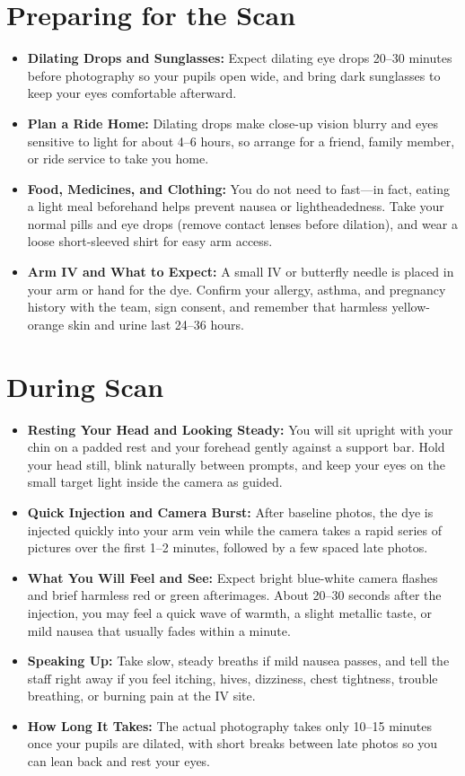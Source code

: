 \section{Preparing for the Scan}

\begin{itemize}
    \item \textbf{Dilating Drops and Sunglasses:} Expect dilating eye drops 20--30 minutes before photography so your pupils open wide, and bring dark sunglasses to keep your eyes comfortable afterward.
    \item \textbf{Plan a Ride Home:} Dilating drops make close-up vision blurry and eyes sensitive to light for about 4--6 hours, so arrange for a friend, family member, or ride service to take you home.
    \item \textbf{Food, Medicines, and Clothing:} You do not need to fast---in fact, eating a light meal beforehand helps prevent nausea or lightheadedness. Take your normal pills and eye drops (remove contact lenses before dilation), and wear a loose short-sleeved shirt for easy arm access.
    \item \textbf{Arm IV and What to Expect:} A small IV or butterfly needle is placed in your arm or hand for the dye. Confirm your allergy, asthma, and pregnancy history with the team, sign consent, and remember that harmless yellow-orange skin and urine last 24--36 hours.
\end{itemize}

\section{During Scan}

\begin{itemize}
    \item \textbf{Resting Your Head and Looking Steady:} You will sit upright with your chin on a padded rest and your forehead gently against a support bar. Hold your head still, blink naturally between prompts, and keep your eyes on the small target light inside the camera as guided.
    \item \textbf{Quick Injection and Camera Burst:} After baseline photos, the dye is injected quickly into your arm vein while the camera takes a rapid series of pictures over the first 1--2 minutes, followed by a few spaced late photos.
    \item \textbf{What You Will Feel and See:} Expect bright blue-white camera flashes and brief harmless red or green afterimages. About 20--30 seconds after the injection, you may feel a quick wave of warmth, a slight metallic taste, or mild nausea that usually fades within a minute.
    \item \textbf{Speaking Up:} Take slow, steady breaths if mild nausea passes, and tell the staff right away if you feel itching, hives, dizziness, chest tightness, trouble breathing, or burning pain at the IV site.
    \item \textbf{How Long It Takes:} The actual photography takes only 10--15 minutes once your pupils are dilated, with short breaks between late photos so you can lean back and rest your eyes.
\end{itemize}

